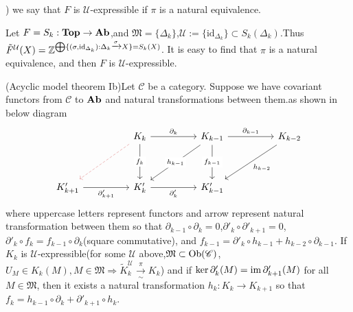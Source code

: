 \documentclass{article}
\begin{document}
) we say that $F$ is $\mathcal{U}$-expressible if $\pi$ is a natural equivalence.
\begin{example}
    Let $F = S_{k} :\bold{Top} \to \bold{Ab}$,and $\mathfrak{M} = \{\Delta_k\}$,$\mathcal{U} := \{\text{id}_{\Delta_k}\}\subset S_k(\Delta_k)$.Thus $\tilde{F}^\mathcal{U}(X) = \mathbb{Z}^{\bigoplus\{(\sigma,\text{id}_{\Delta_k}): \Delta_k \xrightarrow{\sigma} X\} = S_k(X)}$. It is easy to find that $\pi$ is a natural equivalence, and then $F$ is $\mathcal{U}$-expressible.
\end{example}
\begin{theorem}
    (Acyclic model theorem Ib)Let $\mathscr{C}$ be a category. Suppose we have covariant functors from $\mathscr{C}$ to $\bold{Ab}$ and natural transformations between them.as shown in below diagram
    \[\begin{tikzcd}
        && {K_k} && {K_{k-1}} && {K_{k-2}} \\
        \\
        {K'_{k+1}} && {K'_k} && {K'_{k-1}}
        \arrow["{\partial_k}", from=1-3, to=1-5]
        \arrow["{\partial_{k-1}}", from=1-5, to=1-7]
        \arrow["{f_k}"{description}, from=1-3, to=3-3]
        \arrow["{f_{k-1}}"{description}, from=1-5, to=3-5]
        \arrow["{h_{k-1}}"{description}, from=1-5, to=3-3]
        \arrow["{h_{k-2} }", from=1-7, to=3-5]
        \arrow["{\partial'_{k+1}}"', from=3-1, to=3-3]
        \arrow["{\partial'_k}"', from=3-3, to=3-5]
        \arrow[color={rgb,255:red,224;green,133;blue,133}, dashed, from=1-3, to=3-1]
    \end{tikzcd}\]
    where uppercase letters represent functors and arrow represent natural transformation between them so that $\partial_{k-1}\circ \partial_k = 0$,$\partial'_k \circ \partial'_{k+1} = 0$,$\partial'_k \circ f_k = f_{k-1} \circ \partial_k$(square commutative), and $f_{k-1} = \partial'_k \circ h_{k-1} + h_{k-2} \circ \partial_{k-1}$. If $K_k$ is $\mathcal{U}$-expressible(for some $\mathcal{U}$ above,$\mathfrak{M}\subset \operatorname{Ob} (\mathscr{C})$, $U_M \in K_k(M),M \in \mathfrak{M} \Rightarrow \tilde{K}_k^{\mathcal{U}}\xrightarrow[\sim]{\pi}K_k$) and if $\ker \partial'_k(M) = \operatorname{im} \partial_{k+1}'(M)$ for all $M\in\mathfrak{M}$, then it exists a natural transformation $h_k : K_k \to K_{k+1}$ so that $f_k = h_{k-1} \circ \partial_k + \partial'_{k+1} \circ h_k$.
\end{theorem}
\end{document}
